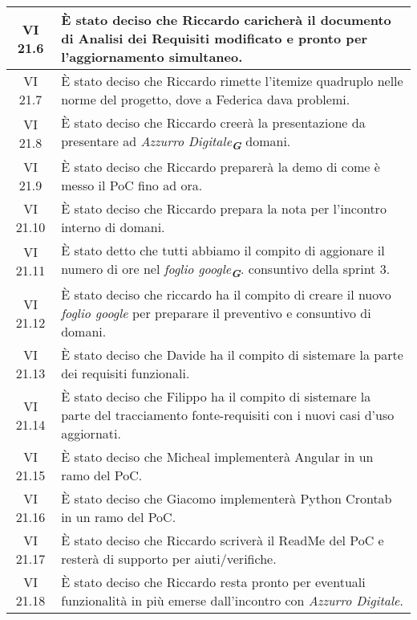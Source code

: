 \begin{table}[htbp]
\begin{tabular}{|c|p{}|}
        \hline
        VI 21.6 & È stato deciso che Riccardo caricherà il documento di Analisi dei Requisiti modificato e pronto per l'aggiornamento simultaneo.\\
        \hline   
        VI 21.7 & È stato deciso che Riccardo rimette l'itemize quadruplo nelle norme del progetto, dove a Federica dava problemi.\\
        \hline 
        VI 21.8 & È stato deciso che Riccardo creerà la presentazione da presentare ad \emph{Azzurro Digitale}\textsubscript{\textit{\textbf{G}}} domani. \\
        \hline 
        VI 21.9 & È stato deciso che Riccardo preparerà la demo di come è messo il PoC fino ad ora. \\
        \hline 
        VI 21.10 & È stato deciso che Riccardo prepara la nota per l'incontro interno di domani. \\
        \hline 
        VI 21.11 & È stato detto che tutti abbiamo il compito di aggionare il numero di ore nel \emph{foglio google}\textsubscript{\textit{\textbf{G}}}. consuntivo della sprint 3. \\
        \hline 
        VI 21.12 & È stato deciso che riccardo ha il compito di creare il nuovo \emph{foglio google} per preparare il preventivo e consuntivo di domani.\\
        \hline
        VI 21.13 & È stato deciso che Davide ha il compito di sistemare la parte dei requisiti funzionali.\\
        \hline  
        VI 21.14 & È stato deciso che Filippo ha il compito di sistemare la parte del tracciamento fonte-requisiti con i nuovi casi d'uso aggiornati.\\
        \hline  
        VI 21.15 & È stato deciso che Micheal implementerà Angular in un ramo del PoC.\\
        \hline  
        VI 21.16 & È stato deciso che Giacomo implementerà Python Crontab in un ramo del PoC.\\
        \hline  
        VI 21.17 & È stato deciso che Riccardo scriverà il ReadMe del PoC e resterà di supporto per aiuti/verifiche. \\
        \hline  
        VI 21.18 & È stato deciso che Riccardo resta pronto per eventuali funzionalità in più emerse dall'incontro con \emph{Azzurro Digitale}.\\
        \hline    

    \end{tabular}
\end{table}

